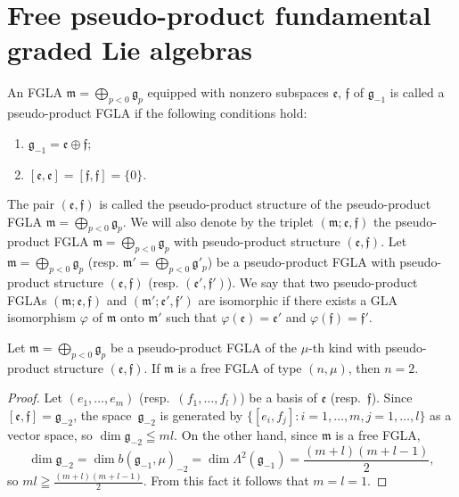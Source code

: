 \section{Free pseudo-product fundamental graded Lie algebras}\label{section8}

An FGLA $\mathfrak m=\bigoplus\limits_{p<0}\mathfrak g_p$ equipped with
nonzero subspaces $\mathfrak e$, $\mathfrak f$ of $\mathfrak g_{-1}$ is called
a pseudo-product FGLA if the following conditions hold:
\begin{enumerate}\itemsep=0pt
\renewcommand{\labelenumi}{$(\roman{enumi})$}
\item $\mathfrak g_{-1}=\mathfrak e\oplus\mathfrak f$;
\item $[\mathfrak e,\mathfrak e]=[\mathfrak f,\mathfrak f]=\{0\}$.
\end{enumerate}
The pair $(\mathfrak e,\mathfrak f)$ is called the pseudo-product structure of
the pseudo-product FGLA
$\mathfrak m=\bigoplus\limits_{p<0}\mathfrak g_p$.
We will also denote by the triplet $(\mathfrak m;\mathfrak e,\mathfrak f)$
the pseudo-product FGLA $\mathfrak m=\bigoplus\limits_{p<0}\mathfrak g_p$
with pseudo-product structure $(\mathfrak e,\mathfrak f)$.
Let $\mathfrak m=\bigoplus\limits_{p<0}\mathfrak g_p$ (resp.
$\mathfrak m'=\bigoplus\limits_{p<0}\mathfrak g'_p$) be a
pseudo-product FGLA with pseudo-product structure $(\mathfrak e,\mathfrak f)$
(resp. $(\mathfrak e',\mathfrak f')$).
We say that two pseudo-product FGLAs $(\mathfrak m;\mathfrak e,\mathfrak f)$
and $(\mathfrak m';\mathfrak e',\mathfrak f')$
are isomorphic if there exists a GLA isomorphism
$\varphi$ of $\mathfrak m$ onto $\mathfrak m'$ such that
$\varphi(\mathfrak e)=\mathfrak e'$ and $\varphi(\mathfrak f)=\mathfrak f'$.
\begin{proposition}\label{prop8.1} Let $\mathfrak m=\bigoplus\limits_{p<0}\mathfrak g_p$ be a
pseudo-product FGLA of the $\mu$-th kind with pseudo-product
structure $(\mathfrak e,\mathfrak f)$.
If $\mathfrak m$ is a free FGLA of type $(n,\mu)$,
then $n=2$.
\end{proposition}

\begin{proof} Let $(e_1,\dots,e_m)$ (resp.\ $(f_1,\dots,f_l)$) be a basis of
$\mathfrak e$ (resp.~$\mathfrak f$).
Since $[\mathfrak e,\mathfrak f]=\mathfrak g_{-2}$,
the space~$\mathfrak g_{-2}$ is generated by
$\{[e_i,f_j]:i=1,\dots,m,j=1,\dots,l\}$ as a vector space, so
$\dim \mathfrak g_{-2}\leqq ml$. On the other hand,
since $\mathfrak m$ is a free FGLA,
\[
\dim \mathfrak g_{-2}=\dim b(\mathfrak g_{-1},\mu)_{-2}=
\dim \Lambda^2(\mathfrak g_{-1})=\frac{(m+l)(m+l-1)}{2},
\]
so $ml\geqq \frac{(m+l)(m+l-1)}{2}$.
From this fact it follows that $m=l=1$.
\end{proof}

